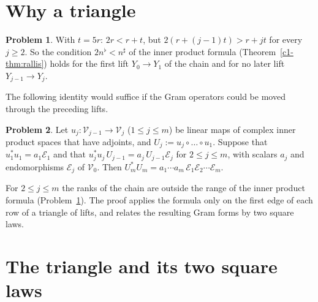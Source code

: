 \documentclass[reqno]{amsart}
\theoremstyle{definition}
\newtheorem{problem}{Problem}[section]
\theoremstyle{plain}
\begin{document}
\section{Why a triangle}\label{sec:why}

\begin{problem}\label{pr:range}
With \(t = 5r\): \(2r < r + t\), but \(2(r + (j-1)t) > r + jt\) for every \(j \ge 2\).  So the condition \(2n^\flat < n^\sharp\) of the inner product formula (Theorem~\ref{c1-thm:rallis}) holds for the first lift \(Y_0 \to Y_1\) of the chain and for no later lift \(Y_{j-1} \to Y_j\).
\end{problem}

The following identity would suffice if the Gram operators could be moved through the preceding lifts.

\begin{problem}\label{pr:push-down}
Let \(u_j \colon \mathcal V_{j-1} \to \mathcal V_j\) (\(1 \le j \le m\)) be linear maps of complex inner product spaces that have adjoints, and \(U_j := u_j \circ \dots \circ u_1\).  Suppose that \(u_1^*u_1 = a_1 \mathcal E_1\) and that \(u_j^*u_j\,U_{j-1} = a_j\,U_{j-1} \mathcal E_j\) for \(2 \le j \le m\), with scalars \(a_j\) and endomorphisms \(\mathcal E_j\) of \(\mathcal V_0\).  Then \(U_m^*U_m = a_1 \cdots a_m\, \mathcal E_1 \mathcal E_2 \cdots \mathcal E_m\).
\end{problem}

For \(2 \le j \le m\) the ranks of the chain are outside the range of the inner product formula (Problem~\ref{pr:range}).  The proof applies the formula only on the first edge of each row of a triangle of lifts, and relates the resulting Gram forms by two square laws.

\section{The triangle and its two square laws}\label{sec:triangle}
\end{document}
